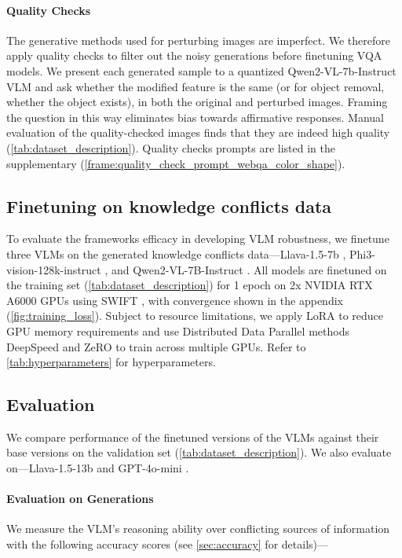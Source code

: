 \paragraph{Quality Checks}
The generative methods used for perturbing images are imperfect. We therefore apply quality checks to filter out the noisy generations before finetuning VQA models. We present each generated sample to a quantized Qwen2-VL-7b-Instruct VLM and ask whether the modified feature is the same (or for object removal, whether the object exists), in both the original and perturbed images.
Framing the question in this way eliminates bias towards affirmative responses. Manual evaluation of the quality-checked images finds that they are indeed high quality (\autoref{tab:dataset_description}). Quality checks prompts are listed in the supplementary (\autoref{frame:quality_check_prompt_webqa_color_shape}).

\subsection{Finetuning on knowledge conflicts data}
To evaluate the \segsub frameworks efficacy in developing VLM robustness, we finetune three VLMs on the generated knowledge conflicts data---Llava-1.5-7b \citep{liu2024improved}, Phi3-vision-128k-instruct \citep{abdin2024phi}, and Qwen2-VL-7B-Instruct \citep{wang2024qwen2}. All models are finetuned on the training set (\autoref{tab:dataset_description}) for 1 epoch on 2x NVIDIA RTX A6000 GPUs using SWIFT \cite{zhao2024swiftascalablelightweightinfrastructure}, with convergence shown in the appendix (\autoref{fig:training_loss}). Subject to resource limitations, we apply LoRA \citep{hu2021lora} to reduce GPU memory requirements and use Distributed Data Parallel methods DeepSpeed \citep{rasley2020deepspeed} and ZeRO \citep{rajbhandari2020zero} to train across multiple GPUs. Refer to \autoref{tab:hyperparameters} for hyperparameters.

\subsection{Evaluation}
We compare performance of the finetuned versions of the VLMs against their base versions on the \segsub validation set (\autoref{tab:dataset_description}). We also evaluate on---Llava-1.5-13b \citep{liu2024improved} and GPT-4o-mini \citep{achiam2023gpt}.

\paragraph{Evaluation on \segsub Generations}
We measure the VLM's reasoning ability over conflicting sources of information with the following accuracy scores (see \autoref{sec:accuracy} for details)---

